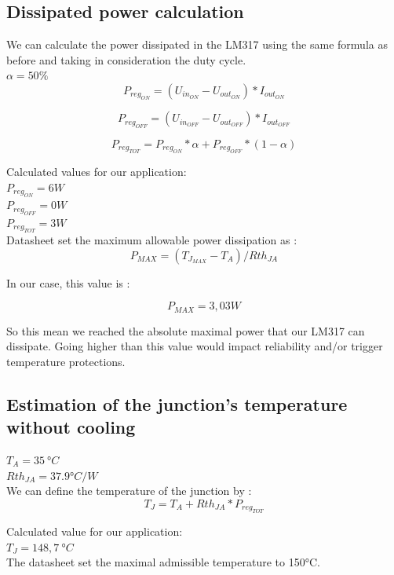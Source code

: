 \subsection{Dissipated power calculation} \label{ssec:num14}
{
	We can calculate the power dissipated in the LM317 using the same formula as before and taking in consideration the duty cycle. \\
	$\alpha = 50\% $ \\
	
	\begin{equation}
		P_{reg_{ON}} = (U_{in_{ON}} - U_{out_{ON}})*I_{out_{ON}}
	\end{equation}
	
	\begin{equation}
		P_{reg_{OFF}} = (U_{in_{OFF}} - U_{out_{OFF}})*I_{out_{OFF}}
	\end{equation}
	
	\begin{equation}
		P_{reg_{TOT}} = P_{reg_{ON}}*\alpha + P_{reg_{OFF}} * (1-\alpha)
	\end{equation}
	
	Calculated values for our application:\\
	$ P_{reg_{ON}} = 6 W $ \\
	$ P_{reg_{OFF}}  = 0 W $ \\
	$ P_{reg_{TOT}} = 3 W $ \\
	
	Datasheet set the maximum allowable power dissipation as : \\
	
	\begin{equation}
		P_{MAX} = (T_{J_{MAX}} - T_{A}) / Rth_{JA}
	\end{equation}

	In our case, this value is :
	
	\begin{equation}
	P_{MAX} = 3,03 W
	\end{equation}

	So this mean we reached the absolute maximal power that our LM317 can dissipate. Going higher than this value would impact reliability and/or trigger temperature protections.

}

\clearpage

\subsection{Estimation of the junction's temperature without cooling} \label{ssec:num15}
{
	$ T_{A} = 35 \ °C $ \\
	$ Rth_{JA} = 37.9 °C/W $\\
	We can define the temperature of the junction by :
	\begin{equation*}
		T_{J} = T_{A} + Rth_{JA} * P_{reg_{TOT}}
	\end{equation*}
	
	Calculated value for our application:\\
	$ T_{J} = 148,7 \ °C $ \\
	
	The datasheet set the maximal admissible temperature to 150°C.
}

